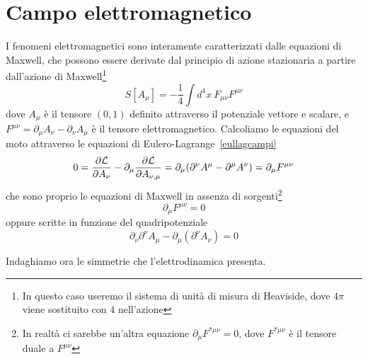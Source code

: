 \section{Campo elettromagnetico}
    I fenomeni elettromagnetici sono interamente caratterizzati dalle equazioni di Maxwell, che possono essere derivate dal principio di azione stazionaria a partire dall'azione di Maxwell\footnote{In questo caso useremo il sistema di unità di misura di Heaviside, dove $4\pi$ viene sostituito con $4$ nell'azione}
\begin{equation} \label{azionemaxwell}
    S[A_\mu] = - \frac{1}{4} \int d^4 x ~ F_{\mu\nu} F^{\mu\nu}
\end{equation}
    dove $A_\mu$ è il tensore $(0, 1)$ definito attraverso il potenziale vettore e scalare, e $F^{\mu\nu} = \partial_\mu A_\nu - \partial_\nu A_\mu$ è il tensore elettromagnetico. Calcoliamo le equazioni del moto attraverso le equazioni di Eulero-Lagrange~\eqref{eullagcampi}
\begin{equation*}
    0 = \frac{\partial\mathcal L}{\partial A_\nu} - \partial_\mu \frac{\partial\mathcal L}{\partial A_{\nu,\mu}} = \partial_\mu (\partial^\nu A^\mu - \partial^\mu A^\nu) = \partial_\mu F^{\mu\nu}
\end{equation*}
    che sono proprio le equazioni di Maxwell in assenza di sorgenti\footnote{In realtà ci sarebbe un'altra equazione $\partial_\mu F^{*\mu\nu} = 0$, dove $F^{*\mu\nu}$ è il tensore duale a $F^{\mu\nu}$}
\begin{equation}\label{eqmax}
    \partial_\mu F^{\mu\nu} = 0
\end{equation}
    oppure scritte in funzione del quadripotenziale
\begin{equation}\label{gauge1}
    \partial_\nu \partial^\nu A_\mu - \partial_\mu (\partial^\nu A_\nu) = 0
\end{equation}

    Indaghiamo ora le simmetrie che l'elettrodinamica presenta.

